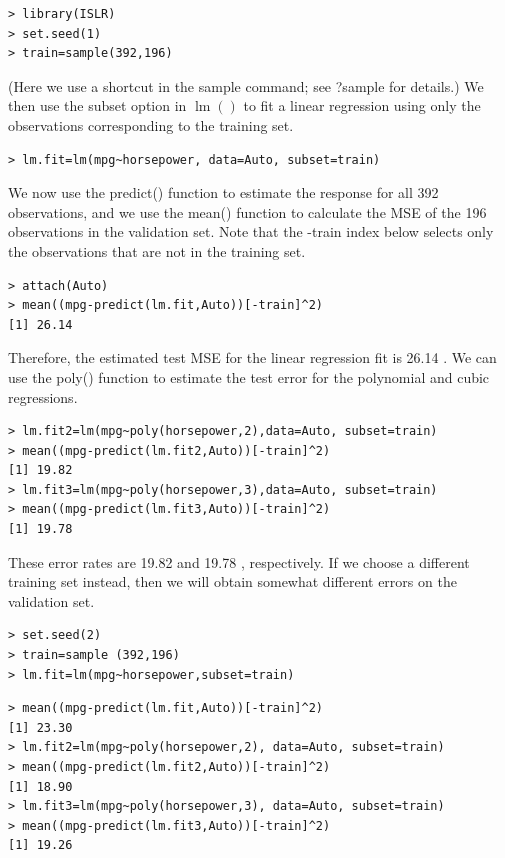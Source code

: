 \documentclass[10pt]{article}
\begin{document}
\begin{verbatim}
> library(ISLR)
> set.seed(1)
> train=sample(392,196)
\end{verbatim}

(Here we use a shortcut in the sample command; see ?sample for details.) We then use the subset option in $\operatorname{lm}()$ to fit a linear regression using only the observations corresponding to the training set.

\begin{verbatim}
> lm.fit=lm(mpg~horsepower, data=Auto, subset=train)
\end{verbatim}

We now use the predict() function to estimate the response for all 392 observations, and we use the mean() function to calculate the MSE of the 196 observations in the validation set. Note that the -train index below selects only the observations that are not in the training set.

\begin{verbatim}
> attach(Auto)
> mean((mpg-predict(lm.fit,Auto))[-train]^2)
[1] 26.14
\end{verbatim}

Therefore, the estimated test MSE for the linear regression fit is 26.14 . We can use the poly() function to estimate the test error for the polynomial and cubic regressions.

\begin{verbatim}
> lm.fit2=lm(mpg~poly(horsepower,2),data=Auto, subset=train)
> mean((mpg-predict(lm.fit2,Auto))[-train]^2)
[1] 19.82
> lm.fit3=lm(mpg~poly(horsepower,3),data=Auto, subset=train)
> mean((mpg-predict(lm.fit3,Auto))[-train]^2)
[1] 19.78
\end{verbatim}

These error rates are 19.82 and 19.78 , respectively. If we choose a different training set instead, then we will obtain somewhat different errors on the validation set.

\begin{verbatim}
> set.seed(2)
> train=sample (392,196)
> lm.fit=lm(mpg~horsepower,subset=train)
\end{verbatim}

\begin{verbatim}
> mean((mpg-predict(lm.fit,Auto))[-train]^2)
[1] 23.30
> lm.fit2=lm(mpg~poly(horsepower,2), data=Auto, subset=train)
> mean((mpg-predict(lm.fit2,Auto))[-train]^2)
[1] 18.90
> lm.fit3=lm(mpg~poly(horsepower,3), data=Auto, subset=train)
> mean((mpg-predict(lm.fit3,Auto))[-train]^2)
[1] 19.26
\end{verbatim}
\end{document}
